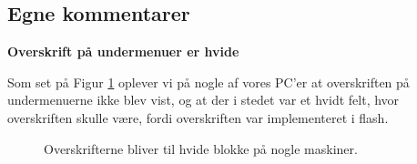 \documentclass[10pt,a4paper]{article}      %
\newcommand{\kommentar}[2]{\item[#1] \textbf{#2}\par\nopagebreak}{}
\newcommand\pic[1]{\texttt{[image: Pics/\#1]}}
\renewcommand\smallproblem{\pic{smallproblem}}
\begin{document}
\subsection{Egne kommentarer}

\begin{kommentarer}
    \kommentar{\smallproblem}{Overskrift på undermenuer er hvide}

    Som set på Figur \ref{fig:hvideblokke} oplever vi på nogle af vores PC'er at
    overskriften på undermenuerne ikke blev vist, og at der i stedet var et hvidt
    felt, hvor overskriften skulle være, fordi overskriften var implementeret i
    flash.

    \begin{figure}[htbp]
        \centering
        \caption{Overskrifterne bliver til hvide blokke på nogle maskiner.}
        \label{fig:hvideblokke}
    \end{figure}
\end{kommentarer}
\end{document}
